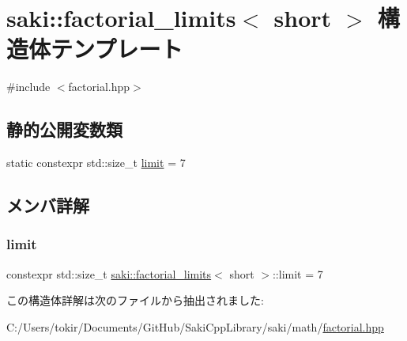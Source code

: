\hypertarget{structsaki_1_1factorial__limits_3_01short_01_4}{}\section{saki\+:\+:factorial\+\_\+limits$<$ short $>$ 構造体テンプレート}
\label{structsaki_1_1factorial__limits_3_01short_01_4}


{\ttfamily \#include $<$factorial.\+hpp$>$}

\subsection*{静的公開変数類}
\begin{DoxyCompactItemize}
\item 
static constexpr std\+::size\+\_\+t \mbox{\hyperlink{structsaki_1_1factorial__limits_3_01short_01_4_ab6e08ed01efb95e0029077725d7133e5}{limit}} = 7
\end{DoxyCompactItemize}


\subsection{メンバ詳解}
\mbox{\label{structsaki_1_1factorial__limits_3_01short_01_4_ab6e08ed01efb95e0029077725d7133e5}} 
\subsubsection{\texorpdfstring{limit}{limit}}
{\footnotesize\ttfamily constexpr std\+::size\+\_\+t \mbox{\hyperlink{structsaki_1_1factorial__limits}{saki\+::factorial\+\_\+limits}}$<$ short $>$\+::limit = 7\hspace{0.3cm}{\ttfamily [static]}}



この構造体詳解は次のファイルから抽出されました\+:\begin{DoxyCompactItemize}
\item 
C\+:/\+Users/tokir/\+Documents/\+Git\+Hub/\+Saki\+Cpp\+Library/saki/math/\mbox{\hyperlink{factorial_8hpp}{factorial.\+hpp}}\end{DoxyCompactItemize}

